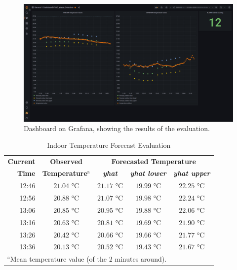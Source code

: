 \documentclass[conference]{IEEEtran}
\begin{document}
\begin{figure}[htbp]
\centerline{\includegraphics[scale=0.125]{figures/figure_grafana.png}}
\caption{Dashboard on Grafana, showing the results of the evaluation.}
\label{fig_grafana}
\end{figure}

\begin{table}[htbp]
\caption{Indoor Temperature Forecast Evaluation}
\begin{center}
\begin{tabular}{|r|c|c|c|c|}
\hline
\textbf{Current} & \textbf{Observed} & \multicolumn{3}{|c|}{\textbf{Forecasted Temperature}} \\
\cline{3-5}
\textbf{Time} & \textbf{Temperature}$^{\mathrm{a}}$ & \textbf{\textit{yhat}} & \textbf{\textit{yhat lower}} & \textbf{\textit{yhat upper}} \\
\hline
12:46 & $21.04$ °C & $21.17$ °C & $19.99$ °C & $22.25$ °C \\
\hline
12:56 & $20.88$ °C & $21.07$ °C & $19.98$ °C & $22.24$ °C \\
\hline
13:06 & $20.85$ °C & $20.95$ °C & $19.88$ °C & $22.06$ °C \\
\hline
13:16 & $20.63$ °C & $20.81$ °C & $19.69$ °C & $21.90$ °C \\
\hline
13:26 & $20.42$ °C & $20.66$ °C & $19.66$ °C & $21.77$ °C \\
\hline
13:36 & $20.13$ °C & $20.52$ °C & $19.43$ °C & $21.67$ °C \\
\hline
\multicolumn{4}{l}{$^{\mathrm{a}}$Mean temperature value (of the 2 minutes around).}
\end{tabular}
\label{tab_forecast_indoor}
\end{center}
\end{table}
\end{document}
